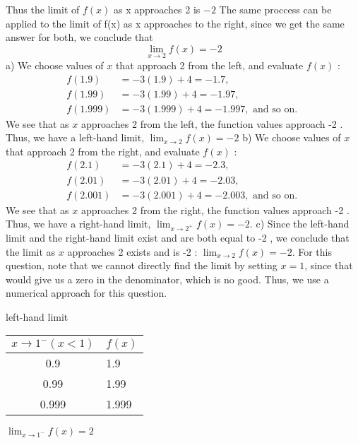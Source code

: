 \documentclass{report}
\begin{document}
\noindent
Thus the limit of $f(x)$ as x approaches 2 is $-2$
\bigbreak \noindent
The same proccess can be applied to the limit of f(x) as x approaches to the right, since we get the same answer for both, we conclude that
$$\displaystyle\lim_{x\to 2}f(x) = -2$$
\bigbreak \noindet
a) We choose values of $x$ that approach 2 from the left, and evaluate $f(x)$ :
$$
\begin{aligned}
f(1.9) & =-3(1.9)+4=-1.7, \\
f(1.99) & =-3(1.99)+4=-1.97, \\
f(1.999) & =-3(1.999)+4=-1.997, \text { and so on. }
\end{aligned}
$$
We see that as $x$ approaches 2 from the left, the function values approach -2 . Thus, we have a left-hand limit, $\lim _{x \rightarrow 2} f(x)=-2$
\bigbreak 
b) We choose values of $x$ that approach 2 from the right, and evaluate $f(x)$ :
$$
\begin{aligned}
f(2.1) & =-3(2.1)+4=-2.3, \\
f(2.01) & =-3(2.01)+4=-2.03, \\
f(2.001) & =-3(2.001)+4=-2.003, \text { and so on. }
\end{aligned}
$$
We see that as $x$ approaches 2 from the right, the function values approach -2 . Thus, we have a right-hand limit, $\lim _{x \rightarrow 2^{+}} f(x)=-2$.
\bigbreak \noindent
c) Since the left-hand limit and the right-hand limit exist and are both equal to -2 , we conclude that the limit as $x$ approaches 2 exists and is -2 : $\lim _{x \rightarrow 2} f(x)=-2$.
\pagebreak
{}
\sol
\bigbreak \noindent
For this question, note that we cannot directly find the limit by setting $x = 1$, since that would give us a zero in the denominator, which is no good.
\bigbreak
\noindent Thus, we use a numerical approach for this question.
\bigbreak \noindent \bigbreak \noindent
\hspace{25mm}\begin{minipage}{0.45\textwidth}
  \hspace{2em}
  left-hand limit
  \vspace{2mm}

\begin{tabular}{|c|l|}
\hline$x \rightarrow 1^{-}(x<1)$ & $f(x)$ \\
\hline 0.9 & 1.9 \\
0.99 & 1.99 \\
0.999 & 1.999 \\
\hline
\end{tabular}
\vspace{4mm}

\hspace{8mm}$\displaystyle\lim_{x\to 1^-}f(x) = 2$
\end{minipage}
\end{document}
